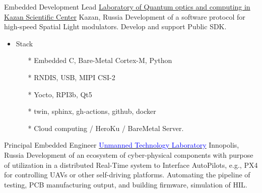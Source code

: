        {Embedded Development Lead}
        {\href{http://kfti.knc.ru/}{\color{blue}Laboratory of Quantum optics and  computing  in  Kazan Scientific Center}}
        {Kazan, Russia}
        {
        \newline
        Development of a software protocol for high-speed Spatial Light modulators.
        Develop and support Public SDK.    
        } 
        {
        \begin{itemize}
            \item Stack
                \begin{itemize}
                \item[*] Embedded C, Bare-Metal Cortex-M, Python
                \item[*] RNDIS, USB, MIPI CSI-2
                \item[*] Yocto, RPI3b, Qt5
                \item[*] twin, sphinx, gh-actions, github, docker
                \item[*] Cloud computing / HeroKu / BareMetal Server.
                \end{itemize}
        \end{itemize}
        }
        {Principal Embedded Engineer}
        {\href{https://robotics.innopolis.university/en/labs/laboratoriya-bespilotnyh-technologyi/}{\textcolor{blue}{Unmanned Technology Laboratory}}}
        {Innopolis, Russia}
        {
        \newline
        Development of an ecosystem of cyber-physical components with purpose of utilization in a distributed Real-Time system to Interface AutoPilots, e.g., PX4 for controlling UAVs or other self-driving platforms. Automating the pipeline of testing, PCB manufacturing output, and building firmware, simulation of HIL.
        } 

